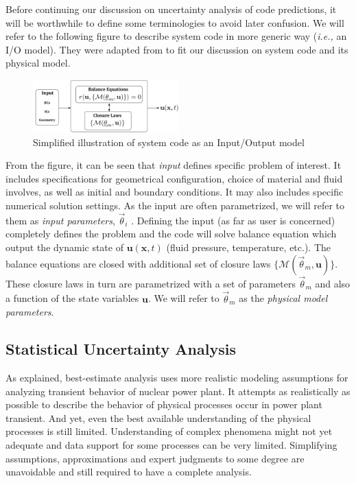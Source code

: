 \documentclass[11pt,titlepage]{article}
\begin{document}
Before continuing our discussion on uncertainty analysis of code predictions, it will be worthwhile to define some terminologies to avoid later confusion.
We will refer to the following figure to describe system code in more generic way (\emph{i.e.,} an I/O model).
They were adapted from \cite{Cheung2011} to fit our discussion on system code and its physical model.
\begin{figure}[htbp]
	\centering
	\includegraphics[width=0.50\textwidth]{Model.pdf}
	\caption{Simplified illustration of system code as an Input/Output model}
	\label{fig:Model}
\end{figure}

From the figure, it can be seen that \emph{input} defines specific problem of interest.
It includes specifications for geometrical configuration, choice of material and fluid involves, as well as initial and boundary conditions.
It may also includes specific numerical solution settings.
As the input are often parametrized, we will refer to them as \emph{input parameters}, $\vec{\theta}_i$ . 
Defining the input (as far as user is concerned) completely defines the problem and the code will solve balance equation which output the dynamic state of $\mathbf{u}(\mathbf{x}, t)$ (fluid pressure, temperature, etc.). 
The balance equations are closed with additional set of closure laws $\{\mathcal{M}(\vec{\theta}_m, \mathbf{u})\}$.
These closure laws in turn are parametrized with a set of parameters $\vec{\theta}_m$ and also a function of the state variables $\mathbf{u}$. 
We will refer to $\vec{\theta}_m$ as the \emph{physical model parameters}.

\subsection{Statistical Uncertainty Analysis} 

As explained, best-estimate analysis uses more realistic modeling assumptions for analyzing transient behavior of nuclear power plant.
It attempts as realistically as possible to describe the behavior of physical processes occur in power plant transient.
And yet, even the best available understanding of the physical processes is still limited. 
Understanding of complex phenomena might not yet adequate and data support for some processes can be very limited.
Simplifying assumptions, approximations and expert judgments to some degree are unavoidable and still required to have a complete analysis. 
\end{document}
